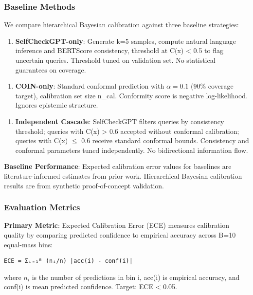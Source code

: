 \subsubsection{Baseline Methods}

We compare hierarchical Bayesian calibration against three baseline strategies:

\begin{enumerate}
\item \textbf{SelfCheckGPT-only}: Generate k=5 samples, compute natural language inference and BERTScore consistency, threshold at C(x) < 0.5 to flag uncertain queries. Threshold tuned on validation set. No statistical guarantees on coverage.
\end{enumerate}

\begin{enumerate}
\item \textbf{COIN-only}: Standard conformal prediction with $\alpha =0.1$ (90\% coverage target), calibration set size n\_cal. Conformity score is negative log-likelihood. Ignores epistemic structure.
\end{enumerate}

\begin{enumerate}
\item \textbf{Independent Cascade}: SelfCheckGPT filters queries by consistency threshold; queries with C(x) > 0.6 accepted without conformal calibration; queries with C(x) $\leq$ 0.6 receive standard conformal bounds. Consistency and conformal parameters tuned independently. No bidirectional information flow.
\end{enumerate}

\textbf{Baseline Performance}: Expected calibration error values for baselines are literature-informed estimates from prior work. Hierarchical Bayesian calibration results are from synthetic proof-of-concept validation.

\subsubsection{Evaluation Metrics}

\textbf{Primary Metric}: Expected Calibration Error (ECE) measures calibration quality by comparing predicted confidence to empirical accuracy across B=10 equal-mass bins:

\begin{verbatim}
ECE = Σᵢ₌₁ᴮ (nᵢ/n) |acc(i) - conf(i)|
\end{verbatim}

where $n_i$ is the number of predictions in bin i, acc(i) is empirical accuracy, and conf(i) is mean predicted confidence. Target: ECE < 0.05.


